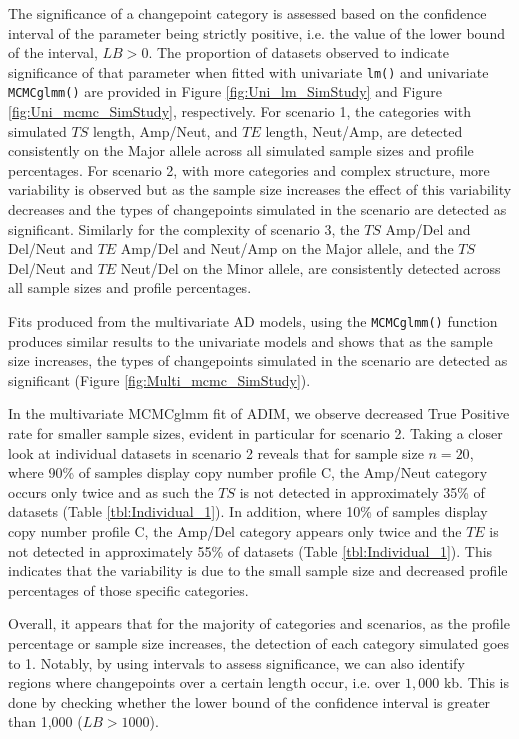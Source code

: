 The significance of a changepoint category is assessed based on the confidence interval of the parameter being strictly positive, i.e. the value of the lower bound of the interval, $LB > 0$. The proportion of datasets observed to indicate significance of that parameter when fitted with univariate \texttt{lm()} and univariate \texttt{MCMCglmm()} are provided in Figure \ref{fig:Uni_lm_SimStudy} and Figure \ref{fig:Uni_mcmc_SimStudy}, respectively. For scenario 1, the categories with simulated $TS$ length, Amp/Neut, and $TE$ length, Neut/Amp, are detected consistently on the Major allele across all simulated sample sizes and profile percentages. For scenario 2, with more categories and complex structure, more variability is observed but as the sample size increases the effect of this variability decreases and the types of changepoints simulated in the scenario are detected as significant. Similarly for the complexity of scenario 3, the $TS$ Amp/Del and Del/Neut and $TE$ Amp/Del and Neut/Amp on the Major allele, and the $TS$ Del/Neut and $TE$ Neut/Del on the Minor allele, are consistently detected across all sample sizes and profile percentages. 

Fits produced from the multivariate AD models, using the \texttt{MCMCglmm()} function produces similar results to the univariate models and shows that as the sample size increases, the types of changepoints simulated in the scenario are detected as significant (Figure \ref{fig:Multi_mcmc_SimStudy}).

In the multivariate MCMCglmm fit of ADIM, we observe decreased True Positive rate for smaller sample sizes, evident in particular for scenario 2. Taking a closer look at individual datasets in scenario 2 reveals that for sample size $n = 20$, where 90\% of samples display copy number profile C, the Amp/Neut category occurs only twice and as such the $TS$ is not detected in approximately 35\% of datasets (Table \ref{tbl:Individual_1}). In addition, where 10\% of samples display copy number profile C, the Amp/Del category appears only twice and the $TE$ is not detected in approximately 55\% of datasets (Table \ref{tbl:Individual_1}). This indicates that the variability is due to the small sample size and decreased profile percentages of those specific categories. 

Overall, it appears that for the majority of categories and scenarios, as the profile percentage or sample size increases, the detection of each category simulated goes to 1. Notably, by using intervals to assess significance, we can also identify regions where changepoints over a certain length occur, i.e. over $1,000$ kb. This is done by checking whether the lower bound of the confidence interval is greater than 1,000 ($LB > 1000$).

